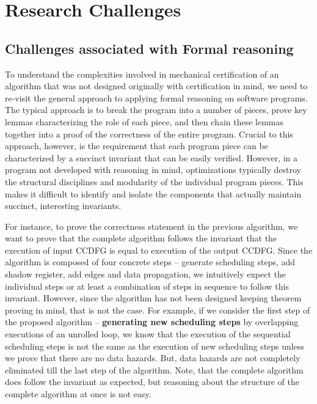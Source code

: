 \chapter{Research Challenges}
\label{sec:challenges}

\section{Challenges associated with Formal reasoning}

To understand the complexities involved in mechanical
certification of an algorithm that was not designed
originally with certification in mind, we need to re-visit
the general approach to applying formal reasoning on
software programs.  The typical approach is to break the
program into a number of pieces, prove key lemmas
characterizing the role of each piece, and then chain these
lemmas together into a proof of the correctness of the
entire program. Crucial to this approach, however, is the
requirement that each program piece can be characterized by
a succinct invariant that can be easily verified.  However,
in a program not developed with reasoning in mind,
optimizations typically destroy the structural disciplines
and modularity of the individual program pieces. This makes it
difficult to identify and isolate the components that
actually maintain succinct, interesting invariants.

For instance, to prove the correctness statement in the previous algorithm, 
we want to prove that the complete algorithm follows
the invariant that the execution of input CCDFG is equal to execution of the output CCDFG.
Since the algorithm is composed of four concrete steps -- generate scheduling steps, add shadow register,
add edges and data propagation, we intuitively expect the individual steps or at least a combination of steps in sequence to
follow this invariant. However, since the algorithm has not been designed keeping theorem proving
in mind, that is not the case. For example, if
we consider the first step of the proposed algorithm -- {\bf generating new scheduling steps} by
overlapping executions of an unrolled loop, we know that the execution 
of the sequential scheduling steps is not the same as the execution of new scheduling steps
unless we prove that there are no data hazards. But, data hazards are not completely eliminated till the last step of the algorithm. Note, that the complete algorithm does follow the invariant as expected, but reasoning about the structure of the
complete algorithm at once is not easy.


